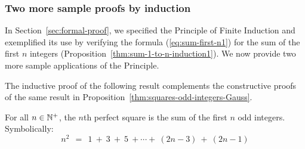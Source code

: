 \bigskip


\subsubsection{Two more sample proofs by induction}
\label{sec:DO-two-more-inductions}

In Section~\ref{sec:formal-proof}, we specified the Principle of Finite Induction and exemplified its use by verifying the formula (\ref{eq:sum-first-n1}) for the sum of the first $n$ integers
(Proposition~\ref{thm:sum-1-to-n-induction1}).  We now provide two more sample applications of the Principle.

\medskip

The inductive proof of the following result complements the constructive proofs of the same result in Proposition~\ref{thm:squares-odd-integers-Gauss}.

\begin{prop}
\label{thm:squares-odd-integers-induction1}
For all $n \in \mathbb{N}^+$, the $n$th perfect square is the sum of the first $n$ odd integers. Symbolically:
\[
n^2 \ \ = \ \
1 \ + \ 3 \ + \ 5 \ + \cdots + \ (2n-3) \ + \ (2n-1)
\]
\end{prop}


